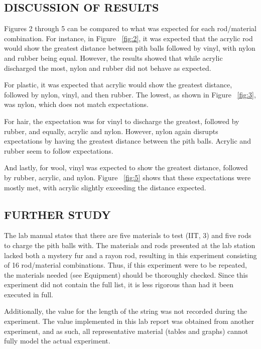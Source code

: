 \documentclass [12pt, letterpaper, twoside]{article}
\begin{document}
\subsection*{DISCUSSION OF RESULTS}
Figures 2 through 5 can be compared to what was expected for each rod/material combination. For instance, in Figure ~\ref{fig:2}, it was expected that the acrylic rod would show the greatest distance between pith balls followed by vinyl, with nylon and rubber being equal. However, the results showed that while acrylic discharged the most, nylon and rubber did not behave as expected.

For plastic, it was expected that acrylic would show the greatest distance, followed by nylon, vinyl, and then rubber. The lowest, as shown in Figure ~\ref{fig:3}, was nylon, which does not match expectations.

For hair, the expectation was for vinyl to discharge the greatest, followed by rubber, and equally, acrylic and nylon. However, nylon again disrupts expectations by having the greatest distance between the pith balls. Acrylic and rubber seem to follow expectations.

And lastly, for wool, vinyl was expected to show the greatest distance, followed by rubber, acrylic, and nylon. Figure ~\ref{fig:5} shows that these expectations were mostly met, with acrylic slightly exceeding the distance expected.

\subsection*{FURTHER STUDY}
The lab manual states that there are five materials to test (IIT, 3) and five rods to charge the pith balls with. The materials and rods presented at the lab station lacked both a mystery fur and a rayon rod, resulting in this experiment consisting of 16 rod/material combinations. Thus, if this experiment were to be repeated, the materials needed (see Equipment) should be thoroughly checked. Since this experiment did not contain the full list, it is less rigorous than had it been executed in full.

Additionally, the value for the length of the string was not recorded during the experiment. The value implemented in this lab report was obtained from another experiment, and as such, all representative material (tables and graphs) cannot fully model the actual experiment.
\end{document}
